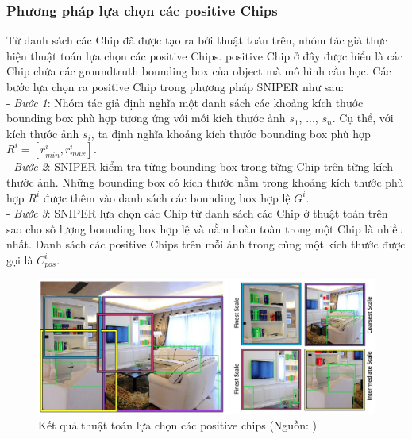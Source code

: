 {    \subsubsection{Phương pháp lựa chọn các positive Chips}
    Từ danh sách các Chip đã được tạo ra bởi thuật toán trên, nhóm tác giả thực hiện thuật toán lựa chọn các positive Chips.
    positive Chip ở đây được hiểu là các Chip chứa các groundtruth  bounding box  của object mà mô hình cần học.
    Các bước lựa chọn ra positive Chip trong phương pháp SNIPER  như sau: \\
    - \textit{Bước 1}: Nhóm tác giả định nghĩa một danh sách các khoảng kích thước bounding box  phù hợp tương ứng với mỗi kích thước ảnh {${s}_{1}$, ..., ${s}_{n}$}.
    Cụ thể, với kích thước ảnh ${s}_{i}$, ta định nghĩa khoảng kích thước bounding box  phù hợp ${R}^{i} = [{r}_{min}^{i}, {r}_{max}^{i}]$. \\
    - \textit{Bước 2}: SNIPER  kiểm tra từng bounding box  trong từng Chip trên từng kích thước ảnh.
    Những bounding box  có kích thước nằm trong khoảng kích thước phù hợp ${R}^{i}$ được thêm vào danh sách các bounding box  hợp lệ ${G}^{i}$. \\
    - \textit{Bước 3}: SNIPER  lựa chọn các Chip từ danh sách các Chip ở thuật toán trên sao cho số lượng bounding box  hợp lệ và nằm hoàn toàn trong một Chip là nhiều nhất.
    Danh sách các positive Chips trên mỗi ảnh trong cùng một kích thước được gọi là ${C}_{pos}^{i}$.

    \begin{figure}[H]
        \centering
        \includegraphics[width=13cm] {images/sniper_pos_chip}
        \caption{Kết quả thuật toán lựa chọn các positive chips (Nguồn: \cite{singh2018sniper})}
        \label{fig:sniper_pos_chip}
    \end{figure}

}
